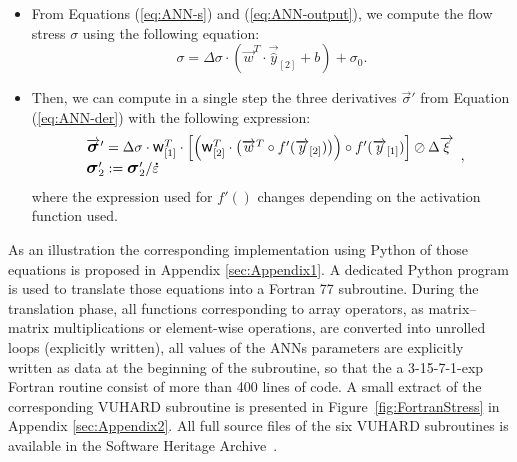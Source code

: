 \documentclass[algorithms,article,accept,pdftex,oneauthor]{Definitions/mdpi}
\DeclareRobustCommand{\w}{\mbox{\large\ensuremath{\mathsf{w}}}}
\DeclareRobustCommand{\lay}[1]{_{[#1]}}
\DeclareRobustCommand{\mdot}[1]{\accentset{\mbox{\bfseries .}}{#1}}
\DeclareRobustCommand{\Sig}{\mbox{\large\ensuremath{\boldsymbol{\sigma}}}}
\begin{document}
\begin{itemize}[align=parleft,leftmargin=*,labelsep=5.mm]
\begin{equation}
\end{equation}
\item From Equations (\ref{eq:ANN-s}) and (\ref{eq:ANN-output}), we compute the flow stress $\sigma$ using the following equation:
\begin{equation}
\sigma = \Delta\sigma\cdot\left(\overrightarrow{w}^T \cdot \overrightarrow{\hat{y}}\lay{2} + b\right) + \sigma_{0}.\label{eq:ANNi6}
\end{equation}
\item Then, we can compute in a single step the three derivatives $\overrightarrow{\sigma}'$ from Equation (\ref{eq:ANN-der}) with the following expression:
\begin{equation}
\begin{array}{l}
\overrightarrow{\Sig}' = \Delta\sigma\cdot\w\lay{1}^T \cdot\left[\left(\w\lay{2}^T \cdot \left(\overrightarrow{w}^T \circ f'(\overrightarrow{y}\lay{2})\right)\right) \circ f'(\overrightarrow{y}\lay{1})\right] \oslash \Delta\overrightarrow{\xi}\\
\Sig_{2}' := \Sig_{2}' / \mdot{\varepsilon}
\end{array},\label{eq:ANNi7}
\end{equation}
\noindent where the expression used for $f'()$ changes depending on the activation function used.
\end{itemize}

As an illustration the corresponding implementation using Python of those equations is proposed in Appendix \ref{sec:Appendix1}.
A dedicated Python program is used to translate those equations into a Fortran 77 subroutine.
During the translation phase, all functions corresponding to array operators, as matrix--matrix multiplications or element-wise operations, are converted into unrolled loops (explicitly written), all values of the ANNs parameters are explicitly written as data at the beginning of the subroutine, so that the a 3-15-7-1-exp Fortran routine consist of more than 400 lines of code.
A small extract of the corresponding VUHARD subroutine is presented in Figure~\ref{fig:FortranStress} in Appendix \ref{sec:Appendix2}.
All full source files of the six VUHARD subroutines is available in the Software Heritage Archive~\cite{Pantale-2023-SSF}.


\end{document}

